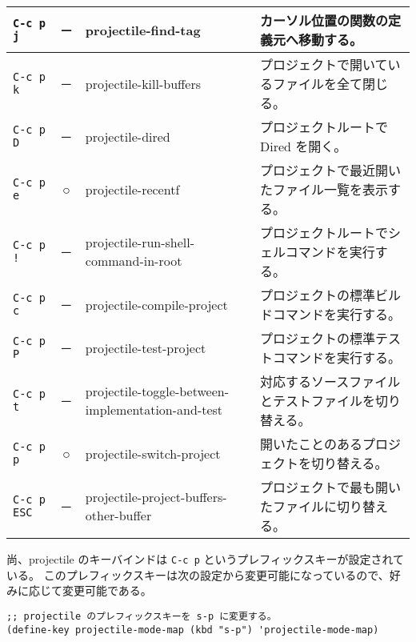 \begin{longtable}{@{}lclp{}@{}}
  \verb|C-c p j|   & －            & {projectile-find-tag}                               & \small{カーソル位置の関数の定義元へ移動する。}                   \\ \midrule
  \verb|C-c p k|   & －            & {projectile-kill-buffers}                           & \small{プロジェクトで開いているファイルを全て閉じる。}           \\ \midrule
  \verb|C-c p D|   & －            & {projectile-dired}                                  & \small{プロジェクトルートで Dired を開く。}                      \\ \midrule
  \verb|C-c p e|   & ○            & {projectile-recentf}                                & \small{プロジェクトで最近開いたファイル一覧を表示する。}         \\ \midrule
  \verb|C-c p !|   & －            & {projectile-run-shell-command-in-root}              & \small{プロジェクトルートでシェルコマンドを実行する。}           \\ \midrule
  \verb|C-c p c|   & －            & {projectile-compile-project}                        & \small{プロジェクトの標準ビルドコマンドを実行する。}             \\ \midrule
  \verb|C-c p P|   & －            & {projectile-test-project}                           & \small{プロジェクトの標準テストコマンドを実行する。}             \\ \midrule
  \verb|C-c p t|   & －            & {projectile-toggle-between-implementation-and-test} & \small{対応するソースファイルとテストファイルを切り替える。}     \\ \midrule
  \verb|C-c p p|   & ○            & {projectile-switch-project}                         & \small{開いたことのあるプロジェクトを切り替える。}               \\ \midrule
  \verb|C-c p ESC| & －            & {projectile-project-buffers-other-buffer}           & \small{プロジェクトで最も開いたファイルに切り替える。}           \\ \bottomrule
\end{longtable}
尚、projectile のキーバインドは \texttt{C-c p} というプレフィックスキーが設定されている。
このプレフィックスキーは次の設定から変更可能になっているので、好みに応じて変更可能である。
\begin{mdframed}[roundcorner=0.50zw,leftmargin=3.00zw,rightmargin=3.00zw,skipabove=0.40zw,skipbelow=0.40zw,innertopmargin=4.00pt,innerbottommargin=4.00pt,innerleftmargin=5.00pt,innerrightmargin=5.00pt,linecolor=gray!020,linewidth=0.50pt,backgroundcolor=gray!20]
\begin{verbatim}
;; projectile のプレフィックスキーを s-p に変更する。
(define-key projectile-mode-map (kbd "s-p") 'projectile-mode-map)
\end{verbatim}
\end{mdframed}
